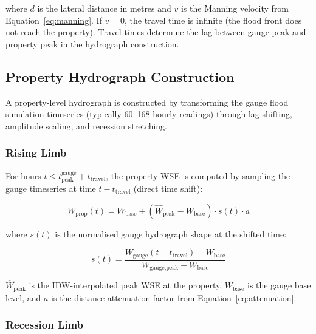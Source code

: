 \documentclass[11pt,a4paper]{article}
\begin{document}
\noindent where $d$ is the lateral distance in metres and $v$ is the Manning
velocity from Equation~\ref{eq:manning}. If $v = 0$, the travel time is infinite
(the flood front does not reach the property). Travel times determine the lag
between gauge peak and property peak in the hydrograph construction.

\subsection{Property Hydrograph Construction}
\label{sec:hydrograph}

A property-level hydrograph is constructed by transforming the gauge flood simulation
timeseries (typically 60--168 hourly readings) through lag shifting, amplitude
scaling, and recession stretching.

\subsubsection{Rising Limb}

For hours $t \leq t_{\text{peak}}^{\text{gauge}} + t_{\text{travel}}$, the property
WSE is computed by sampling the gauge timeseries at time $t - t_{\text{travel}}$
(direct time shift):

\begin{equation}
    W_{\text{prop}}(t) = W_{\text{base}} +
    (\hat{W}_{\text{peak}} - W_{\text{base}}) \cdot s(t) \cdot a
    \label{eq:rising}
\end{equation}

\noindent where $s(t)$ is the normalised gauge hydrograph shape at the shifted time:

\begin{equation}
    s(t) = \frac{W_{\text{gauge}}(t - t_{\text{travel}}) - W_{\text{base}}}
    {W_{\text{gauge,peak}} - W_{\text{base}}}
    \label{eq:shape}
\end{equation}

\noindent $\hat{W}_{\text{peak}}$ is the IDW-interpolated peak WSE at the property,
$W_{\text{base}}$ is the gauge base level, and $a$ is the distance attenuation
factor from Equation~\ref{eq:attenuation}.

\subsubsection{Recession Limb}
\end{document}
